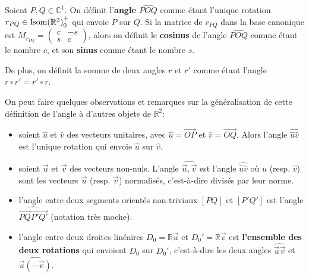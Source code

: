 \documentclass{book}
\numberwithin{equation}{section}
\providecommand{\plan}{{\mathbb R^2}}
\providecommand{\isom}{{\textnormal{Isom}(\plan)}}
\providecommand{\isomop}{\isom_0^+}
\providecommand{\unitcircle}{{\mathbb C^1}}
\begin{document}
\begin{defn}
	Soient $P, Q \in \unitcircle$. On définit l'\textbf{angle $\widehat{POQ}$} comme étant l'unique rotation $r_{PQ} \in \isomop$ qui envoie $P$ sur $Q$. Si la matrice de $r_{PQ}$ dans la base canonique est $M_{r_{PQ}} = \left(\begin{smallmatrix} c & -s \\ s & c \end{smallmatrix}\right)$, alors on définit le \textbf{cosinus} de l'angle $\widehat{POQ}$ comme étant le nombre $c$, et son \textbf{sinus} comme étant le nombre $s$.\par
	De plus, on définit la somme de deux angles $r$ et $r'$ comme étant l'angle $r \circ r' = r' \circ r$.
\end{defn}

On peut faire quelques observations et remarques sur la généralisation de cette définition de l'angle à d'autres objets de $\plan$:
\begin{itemize}
	\item soient $\hat u$ et $\hat v$ des vecteurs unitaires, avec $\hat u = \overrightarrow{OP}$ et $\hat v = \overrightarrow{OQ}$. Alors l'angle $\widehat{\hat u \hat v}$ est l'unique rotation qui envoie $\hat u$ sur $\hat v$.
	\item soient $\vec u$ et $\vec v$ des vecteurs non-nuls. L'angle $\widehat{\vec u, \vec v}$ est l'angle $\widehat{\hat u \hat v}$ où $\hat u$ (resp. $\hat v$) sont les vecteurs $\vec u$ (resp. $\vec v$) normalisés, c'est-à-dire divisés par leur norme.
	\item l'angle entre deux segments orientés non-triviaux $[PQ]$ et $[P'Q']$ est l'angle $\widehat{\overrightarrow{PQ} \overrightarrow{P'Q'}}$ (notation très moche).
	\item l'angle entre deux droites linéaires $D_0 = \mathbb R \vec u$ et $D_0' = \mathbb R \vec v$ est \textbf{l'ensemble des deux rotations} qui envoient $D_0$ sur $D_0'$, c'est-à-dire les deux angles $\widehat{\vec u \vec v}$ et $\widehat{\vec u (-\vec v)}$.
\end{itemize}

\end{document}
